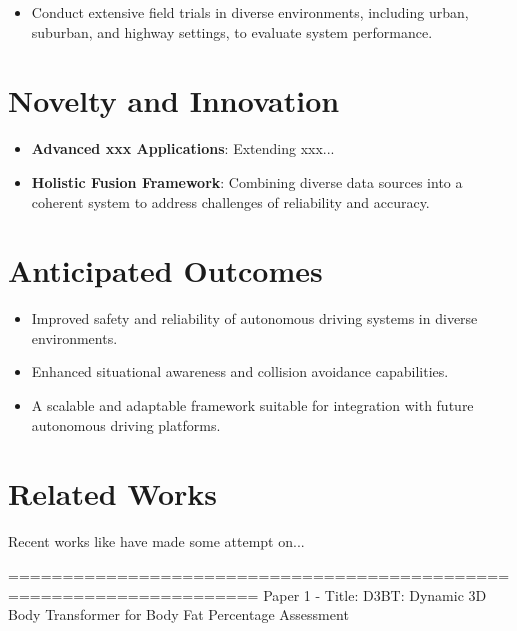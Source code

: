\documentclass[conference, 12pt]{IEEEtran}
\begin{document}
\begin{itemize}
\item Conduct extensive field trials in diverse environments, including urban, suburban, and highway settings, to evaluate system performance.
\end{itemize}

\section{Novelty and Innovation}

\begin{itemize}
\item \textbf{Advanced xxx Applications}: Extending xxx...
\item \textbf{Holistic Fusion Framework}: Combining diverse data sources into a coherent system to address challenges of reliability and accuracy.
\end{itemize}

\section{Anticipated Outcomes}

\begin{itemize}
\item Improved safety and reliability of autonomous driving systems in diverse environments.
\item Enhanced situational awareness and collision avoidance capabilities.
\item A scalable and adaptable framework suitable for integration with future autonomous driving platforms.
\end{itemize}


\section{Related Works}
Recent works like \cite{cho2023mmwall} have made some attempt on...

=====================================================================
Paper 1 - Title: D3BT: Dynamic 3D Body Transformer for Body Fat Percentage Assessment
\end{document}

